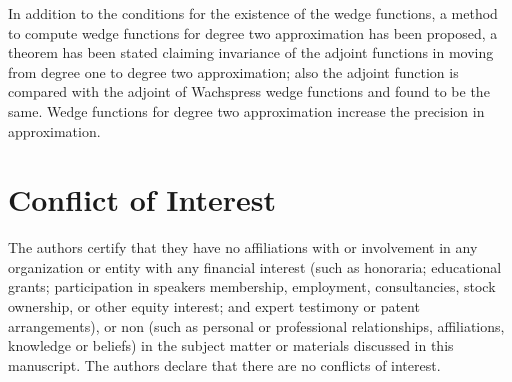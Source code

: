 In addition to the conditions for the existence of the wedge functions, a method
to compute wedge functions for degree two approximation has been proposed, a
theorem has been stated claiming invariance of the adjoint functions in moving
from degree one to degree two approximation; also the adjoint function is
compared with the adjoint of Wachspress wedge functions and found to be the
same. Wedge functions for degree two approximation increase the precision in
approximation.

\section{Conflict of Interest}
The authors certify that they have no affiliations with or involvement in any
organization or entity with any financial interest (such as honoraria;
educational grants; participation in speakers membership, employment,
consultancies, stock ownership, or other equity interest; and expert testimony
or patent arrangements), or non (such as personal or professional relationships,
affiliations, knowledge or beliefs) in the subject matter or materials discussed
in this manuscript. The authors declare that there are no conflicts of interest.

\printbibliography



